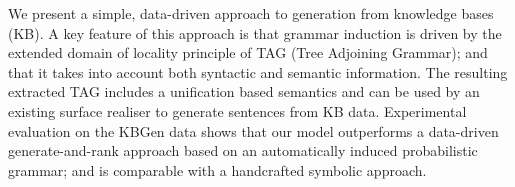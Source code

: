 We present a simple, data-driven approach to generation from knowledge bases (KB). A key feature of this approach is that grammar induction is driven by the extended domain of locality principle of TAG (Tree Adjoining Grammar); and that it takes into account both syntactic and semantic information. The resulting extracted TAG includes a unification based semantics and can be used by an existing surface realiser to generate sentences from KB data. Experimental evaluation on the KBGen data shows that our model outperforms a data-driven generate-and-rank approach based on an automatically induced probabilistic grammar; and is comparable with a handcrafted symbolic approach.
